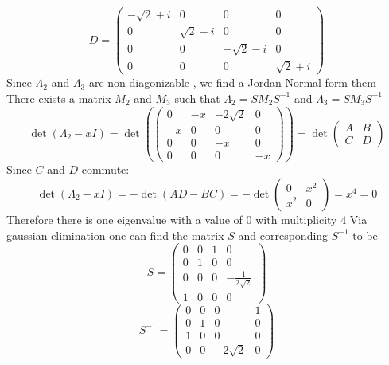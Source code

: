 \begin{equation}
    D = \begin{pmatrix}
    - \sqrt{2} + i & 0 & 0 & 0 \\
    0 & \sqrt{2} - i & 0 & 0 \\
    0 & 0 & - \sqrt{2} - i & 0 \\
    0 & 0 & 0 & \sqrt{2} + i \end{pmatrix}
\end{equation}
Since $\Lambda_{2}$ and $\Lambda_{3}$ are non-diagonizable , we find a Jordan Normal form them
There exists a matrix $M_{2}$ and $M_{3}$ such that $\Lambda_{2} = SM_{2}S^{-1}$ and $\Lambda_{3} = SM_{3}S^{-1}$
\begin{equation}
    \det (\Lambda_{2} - xI) = \det \left( \begin{pmatrix}
    0 & -x & -2\sqrt{2} & 0 \\
    -x & 0 & 0 & 0 \\
    0 & 0 & -x & 0 \\
    0 & 0 & 0 & -x \end{pmatrix} \right) = \det \begin{pmatrix} A & B \\ C & D \end{pmatrix}
\end{equation}
Since $C$ and $D$ commute:
\begin{equation}
    \det (\Lambda_{2} - xI) = -\det ( AD - BC) = -\det \begin{pmatrix} 0 & x^2 \\ x^2 & 0 \end{pmatrix}  = x^{4} = 0 
\end{equation}
Therefore there is one eigenvalue with a value of $0$ with multiplicity $4$ \newline
Via gaussian elimination one can find the matrix $S$ and corresponding $S^{-1}$ to be
\begin{equation}
    S = \begin{pmatrix} 0 & 0 & 1 & 0 \\ 0 & 1 & 0 & 0 \\ 0 & 0 & 0 & -\frac{1}{2\sqrt{2}} \\ 1 & 0 & 0 & 0 \end{pmatrix}
\end{equation}
\begin{equation}
    S^{-1} = \begin{pmatrix} 0 & 0 & 0 & 1 \\ 0 & 1 & 0 & 0 \\ 1 &0&0 &0 \\ 0 & 0 & -2\sqrt{2} & 0 \end{pmatrix}
\end{equation}
